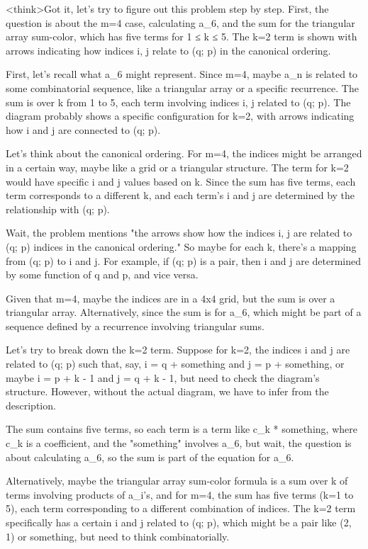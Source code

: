 <think>Got it, let's try to figure out this problem step by step. First, the question is about the m=4 case, calculating a_6, and the sum for the triangular array sum-color, which has five terms for 1 ≤ k ≤ 5. The k=2 term is shown with arrows indicating how indices i, j relate to (q; p) in the canonical ordering. 

First, let's recall what a_6 might represent. Since m=4, maybe a_n is related to some combinatorial sequence, like a triangular array or a specific recurrence. The sum is over k from 1 to 5, each term involving indices i, j related to (q; p). The diagram probably shows a specific configuration for k=2, with arrows indicating how i and j are connected to (q; p). 

Let's think about the canonical ordering. For m=4, the indices might be arranged in a certain way, maybe like a grid or a triangular structure. The term for k=2 would have specific i and j values based on k. Since the sum has five terms, each term corresponds to a different k, and each term's i and j are determined by the relationship with (q; p). 

Wait, the problem mentions "the arrows show how the indices i, j are related to (q; p) indices in the canonical ordering." So maybe for each k, there's a mapping from (q; p) to i and j. For example, if (q; p) is a pair, then i and j are determined by some function of q and p, and vice versa. 

Given that m=4, maybe the indices are in a 4x4 grid, but the sum is over a triangular array. Alternatively, since the sum is for a_6, which might be part of a sequence defined by a recurrence involving triangular sums. 

Let's try to break down the k=2 term. Suppose for k=2, the indices i and j are related to (q; p) such that, say, i = q + something and j = p + something, or maybe i = p + k - 1 and j = q + k - 1, but need to check the diagram's structure. However, without the actual diagram, we have to infer from the description. 

The sum contains five terms, so each term is a term like c_k * something, where c_k is a coefficient, and the "something" involves a_6, but wait, the question is about calculating a_6, so the sum is part of the equation for a_6. 

Alternatively, maybe the triangular array sum-color formula is a sum over k of terms involving products of a_i's, and for m=4, the sum has five terms (k=1 to 5), each term corresponding to a different combination of indices. The k=2 term specifically has a certain i and j related to (q; p), which might be a pair like (2, 1) or something, but need to think combinatorially. 

